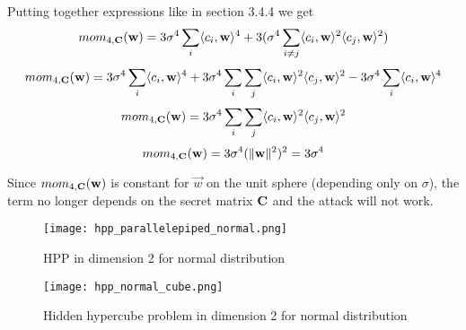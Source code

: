     Putting together expressions like in section 3.4.4 we get 
    \[
        mom_{4, \mathbf{C}}(\mathbf{w}) = 3 \sigma ^4 \sum_i \langle c_i, \mathbf{w} \rangle ^4 + 3(\sigma^4 \sum_{i \neq j}\langle c_i, \mathbf{w} \rangle ^2 \langle c_j, \mathbf{w} \rangle ^2)
    \]
    \[
        mom_{4, \mathbf{C}}(\mathbf{w}) = 3 \sigma ^4 \sum_i \langle c_i, \mathbf{w} \rangle ^4 
        + 3\sigma^4 \sum_{i} \sum_{j} \langle c_i, \mathbf{w} \rangle ^2 \langle c_j, \mathbf{w} \rangle ^2
        - 3\sigma^4 \sum_{i} \langle c_i, \mathbf{w} \rangle ^4
    \]
    \[
        mom_{4, \mathbf{C}}(\mathbf{w}) = 3\sigma^4 \sum_{i} \sum_{j} \langle c_i, \mathbf{w} \rangle ^2 \langle c_j, \mathbf{w} \rangle ^2
    \]
    \[
        mom_{4, \mathbf{C}}(\mathbf{w}) = 3\sigma^4 (\lVert \mathbf{w} \rVert ^2 ) ^2 = 3 \sigma ^4
    \]

    Since $mom_{4, \mathbf{C}}(\mathbf{w})$ is constant for $\vec{w}$ on the unit sphere (depending only on $\sigma$), the term no longer depends on the secret matrix $\mathbf{C}$ and the attack will not work.

    \begin{figure}[H]
    \centering
        \centering
        \texttt{[image: hpp\_parallelepiped\_normal.png]} %
        \caption{HPP in dimension 2 for normal distribution}
        \medskip 
\end{figure}
\begin{figure}[H]
        \centering
        \texttt{[image: hpp\_normal\_cube.png]} %
        \caption{Hidden hypercube problem in dimension 2 for normal distribution}
        \medskip 
\end{figure}

